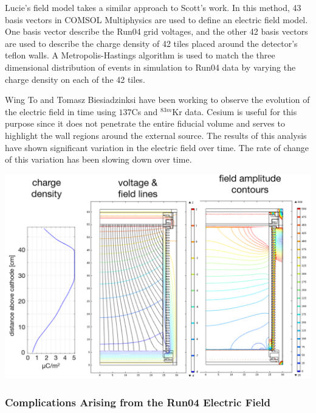 \documentclass[a4paper,12pt]{article}
\begin{document}
{Lucie's field model takes a similar approach to Scott's work.  In this method, 43 basis vectors in COMSOL Multiphysics are used to define an electric field model.  One basis vector describe the Run04 grid voltages, and the other 42 basis vectors are used to describe the charge density of 42 tiles placed around the detector's teflon walls.  A Metropolis-Hastings algorithm is used to match the three dimensional distribution of events in simulation to Run04 data by varying the charge density on each of the 42 tiles.  \cite{LuciesMap} 

Wing To and Tomasz Biesiadzinksi have been working to observe the evolution of the electric field in time using $137$Cs and $^{83m}$Kr data.  Cesium is useful for this purpose since it does not penetrate the entire fiducial volume and serves to highlight the wall regions around the external source.  The results of this analysis have shown significant variation in the electric field over time. The rate of change of this variation has been slowing down over time. \cite{FieldOverTime}


\begin{center} 
\includegraphics[scale=0.4]{Run04Corrections/Sep2014_Field_Detailed.png}
\label{fig:ScottsFieldMap}
\end{center}

\subsubsection{Complications Arising from the Run04 Electric Field} \label{section:NEST}

}
\end{document}
